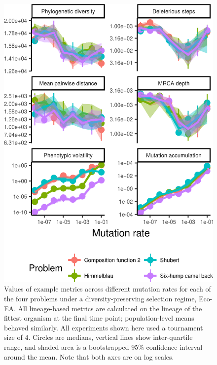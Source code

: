 \documentclass[letterpaper]{article}
\newcommand{\reduceCaptionPadding}{\setlength{\belowcaptionskip}{-10pt}}
\begin{document}
\begin{figure}
\includegraphics[width=\columnwidth]{figs/eco_mutation_rate_crop.png}
\reduceCaptionPadding
\caption{\small Values of example metrics across different mutation rates for each of the four problems under a diversity-preserving selection regime, Eco-EA. All lineage-based metrics are calculated on the lineage of the fittest organism at the final time point; population-level means behaved similarly. All experiments shown here used a tournament size of 4. Circles are medians, vertical lines show inter-quartile range, and shaded area is a bootstrapped 95\% confidence interval around the mean. Note that both axes are on log scales.}
\label{fig:ecology}
\end{figure}
\end{document}
